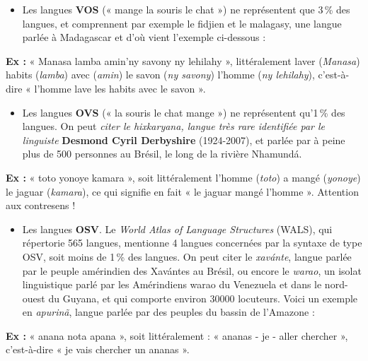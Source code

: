 \begin{itemize}
\item Les langues \textbf{VOS} (« mange la souris le chat ») ne représentent que 3\,\% des langues, et comprennent par exemple le fidjien et le malagasy, une langue parlée à Madagascar et d’où vient l’exemple ci-dessous :
\end{itemize}
\noindent\textbf{Ex :} « Manasa lamba amin’ny savony ny lehilahy », littéralement laver (\textit{Manasa}) habits (\textit{lamba}) avec (\textit{amin}) le savon (\textit{ny savony}) l’homme (\textit{ny lehilahy}), c’est-à-dire « l’homme lave les habits avec le savon ».
\begin{itemize}
\item Les langues \textbf{OVS} (« la souris le chat mange ») ne représentent qu’1\,\% des langues. On peut \textit{citer le hixkaryana, langue très rare identifiée par le linguiste} \textbf{Desmond Cyril Derbyshire} (1924-2007), et parlée par à peine plus de 500 personnes au Brésil, le long de la rivière Nhamundá.
\end{itemize}
\noindent\textbf{Ex :} « toto yonoye kamara », soit littéralement l’homme (\textit{toto}) a mangé (\textit{yonoye}) le jaguar (\textit{kamara}), ce qui signifie en fait « le jaguar mangé l’homme ». Attention aux contresens !
\begin{itemize}
\item Les langues \textbf{OSV}. Le \textit{World Atlas of Language Structures} (WALS), qui répertorie 565 langues, mentionne 4 langues concernées par la syntaxe de type OSV, soit moins de 1\,\% des langues. On peut citer le \textit{xavánte}, langue parlée par le peuple amérindien des Xavántes au Brésil, ou encore le \textit{warao}, un isolat linguistique parlé par les Amérindiens warao du Venezuela et dans le nord-ouest du Guyana, et qui comporte environ 30000 locuteurs. Voici un exemple en \textit{apurinã}, langue parlée par des peuples du bassin de l’Amazone :
\end{itemize}
\noindent\textbf{Ex :} « anana nota apana », soit littéralement : « ananas - je - aller chercher », c’est-à-dire « je vais chercher un ananas ».

